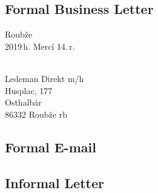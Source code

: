 \subsection{Formal Business Letter}
{\small
\begin{flushright}
	Roub\v{z}e\\
	2019\,h. Merc\'i 14.\,r.
\end{flushright}

\\
Ledeman Direkt {\sc m/h}\\
Husplac, \textnumero{} 177\\
Osthalb\'ar\\
86332 Roub\v{z}e {\sc rb}
}

\subsection{Formal E-mail}




\subsection{Informal Letter}

